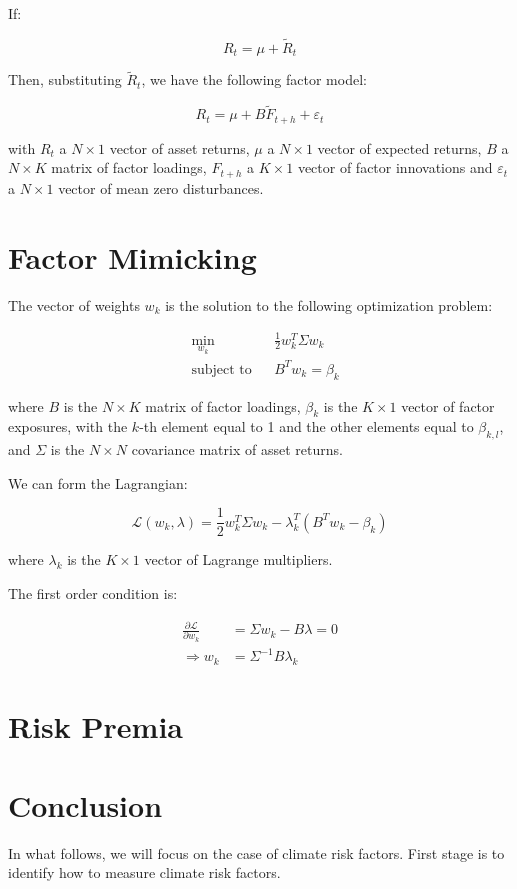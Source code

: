 If:

\begin{equation}
    R_t = \mu + \tilde{R}_t
\end{equation}

Then, substituting $\tilde{R}_t$, we have the following factor model:

\begin{equation}
    R_t = \mu + B \tilde{F}_{t+h} + \varepsilon_t
\end{equation}

with $R_t$ a $N \times 1$ vector of 
asset returns, $\mu$ a $N \times 1$ vector
of expected returns, $B$ a $N \times K$ matrix
of factor loadings, $F_{t+h}$ a $K \times 1$ vector
of factor innovations and $\varepsilon_t$ a $N \times 1$
vector of mean zero disturbances.



\section{Factor Mimicking}

The vector of weights $w_k$ 
is the solution to the following optimization problem:

\begin{equation}
    \begin{aligned}
        & \underset{w_k}{\min}
        & &  \frac{1}{2} w_k^T \Sigma w_k \\
        & \text{subject to}
        & & B^T w_k = \beta_k
    \end{aligned}
\end{equation}

where $B$ is the $N \times K$ matrix of factor loadings, $\beta_k$ is the $K \times 1$ vector of factor exposures,
with the $k$-th element equal to 1 and the other elements equal to $\beta_{k,l}$, 
and $\Sigma$ is the $N \times N$ covariance matrix of asset returns.

We can form the Lagrangian:

\begin{equation}
    \mathcal{L}(w_k, \lambda) = \frac{1}{2} w_k^T \Sigma w_k - \lambda_k^T (B^T w_k - \beta_k)
\end{equation}

where $\lambda_k$ is the $K \times 1$ vector of Lagrange multipliers.

The first order condition is:

\begin{equation}
    \begin{aligned}
        \frac{\partial \mathcal{L}}{\partial w_k} &= \Sigma w_k - B \lambda = 0 \\
        \Rightarrow w_k &= \Sigma^{-1} B \lambda_k
    \end{aligned}
\end{equation}


\section{Risk Premia}

\section{Conclusion}

In what follows, we will focus 
on the case of climate risk factors.
First stage is to identify how to measure 
climate risk factors.
